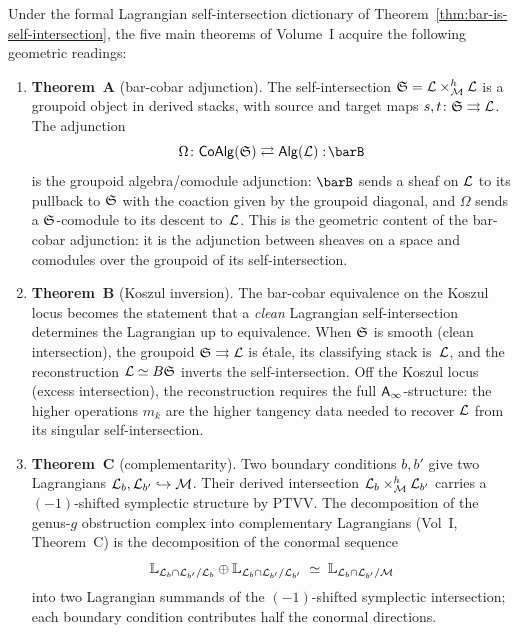 \begin{proposition}
\label{prop:five-from-lagrangian}
Under the formal Lagrangian self-intersection dictionary of
Theorem~\textup{\ref{thm:bar-is-self-intersection}}, the five
main theorems of Volume~I acquire the following geometric
readings:
\begin{enumerate}[label=\textup{(\Alph*)},leftmargin=2.2em]
\item \textbf{Theorem~A} \textup{(}bar-cobar adjunction\textup{)}.
 The self-intersection $\mathfrak{S} = \mathcal L \times_\mathcal M^h \mathcal L$ is a
 groupoid object in derived stacks, with source and target maps
 $s,t\colon \mathfrak{S} \rightrightarrows \mathcal L$. The adjunction
 \[
 \Omega\colon \mathsf{CoAlg}(\Steinb) \rightleftarrows
 \mathsf{Alg}(\cL) :\!\barB
 \]
 is the groupoid algebra/comodule adjunction: $\barB$ sends a
 sheaf on $\mathcal L$ to its pullback to $\mathfrak{S}$ with the
 coaction given by the groupoid diagonal, and $\Omega$ sends a
 $\mathfrak{S}$-comodule to its descent to~$\mathcal L$. This is the
 geometric content of the bar-cobar adjunction: it is the
 adjunction between sheaves on a space and comodules over the
 groupoid of its self-intersection.

\item \textbf{Theorem~B} \textup{(}Koszul inversion\textup{)}.
 The bar-cobar equivalence on the Koszul locus becomes the
 statement that a \emph{clean} Lagrangian self-intersection
 determines the Lagrangian up to equivalence. When
 $\mathfrak{S}$ is smooth (clean intersection), the groupoid
 $\mathfrak{S} \rightrightarrows \mathcal L$ is \'{e}tale, its classifying
 stack is~$\mathcal L$, and the reconstruction
 $\mathcal L \simeq B\mathfrak{S}$ inverts the self-intersection. Off the
 Koszul locus (excess intersection), the reconstruction requires
 the full $\mathsf{A}_{\infty}$-structure: the higher operations $m_k$ are
 the higher tangency data needed to recover $\mathcal L$ from its
 singular self-intersection.

\item \textbf{Theorem~C} \textup{(}complementarity\textup{)}.
 Two boundary conditions $b, b'$ give two Lagrangians
 $\mathcal L_b, \mathcal L_{b'} \hookrightarrow \mathcal M$. Their derived
 intersection $\mathcal L_b \times_\mathcal M^h \mathcal L_{b'}$ carries a
 $(-1)$-shifted symplectic structure by PTVV\@. The
 decomposition of the genus-$g$ obstruction complex into
 complementary Lagrangians (Vol~I, Theorem~C) is the
 decomposition of the conormal sequence
 \[
 \mathbb{L}_{\mathcal L_b \cap \mathcal L_{b'}/\mathcal L_b}
 \oplus
 \mathbb{L}_{\mathcal L_b \cap \mathcal L_{b'}/\mathcal L_{b'}}
 \;\simeq\;
 \mathbb{L}_{\mathcal L_b \cap \mathcal L_{b'}/\mathcal M}
 \]
 into two Lagrangian summands of the $(-1)$-shifted symplectic
 intersection; each boundary condition contributes half the
 conormal directions.


\end{enumerate}
\end{proposition}
